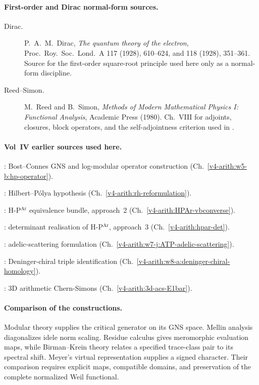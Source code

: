 \paragraph{First-order and Dirac normal-form sources.}
\begin{description}
\item[Dirac.] P.~A.~M.~Dirac, \emph{The quantum theory of the
electron}, Proc.~Roy.~Soc.~Lond.~A 117 (1928), 610--624, and
118 (1928), 351--361. Source for the first-order square-root
principle used here only as a normal-form discipline.
\item[Reed--Simon.] M.~Reed and B.~Simon, \emph{Methods of Modern
Mathematical Physics I: Functional Analysis}, Academic Press (1980).
Ch.~VIII for adjoints, closures, block operators, and the
self-adjointness criterion used in
.
\end{description}

\paragraph{Vol~IV earlier sources used here.}
\begin{description}
\item {}: Bost--Connes GNS and
log-modular operator construction (Ch.~\ref{v4-arith:w5-b:hp-operator}).
\item {}: Hilbert--P\'olya hypothesis
(Ch.~\ref{v4-arith:rh-reformulation}).
\item {}: H-P\(^{\mathrm{Ar}}\) equivalence bundle, approach~2
(Ch.~\ref{v4-arith:HPAr-vbconverse}).
\item {}: determinant realisation of H-P\(^{\mathrm{Ar}}\), approach~3
(Ch.~\ref{v4-arith:hpar-det}).
\item {}: adelic-scattering
formulation (Ch.~\ref{v4-arith:w7-j:ATP-adelic-scattering}).
\item {}: Deninger-chiral
triple identification (Ch.~\ref{v4-arith:w8-a:deninger-chiral-homology}).
\item {}: 3D arithmetic Chern-Simons
(Ch.~\ref{v4-arith:3d-acs-E1bar}).
\end{description}

\paragraph{Comparison of the constructions.}
Modular theory supplies the critical generator on its GNS space.
Mellin analysis diagonalizes idele norm scaling. Residue calculus
gives meromorphic evaluation maps, while Birman--Krein theory
relates a specified trace-class pair to its spectral shift.
Meyer's virtual representation supplies a signed character.
Their comparison requires explicit maps, compatible domains,
and preservation of the complete normalized Weil functional.
